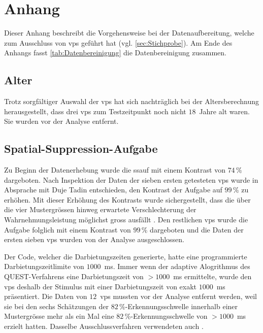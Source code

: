 \documentclass[11pt, twoside, a4paper]{book}		%
\begin{document}
\appendix
\setcounter{figure}{0}
\renewcommand\thefigure{\Alph{appndx}\@arabic\c@figure}
\setcounter{table}{0}
\renewcommand{\thetable}{A\arabic{table}}


\chapter[Anhang - Datenaufbereitung]{Anhang \label{cha:Anhang_A}}
Dieser Anhang beschreibt die Vorgehensweise bei der Datenaufbereitung, welche zum Ausschluss von \glspl{vp} geführt hat (vgl. \autoref{sec:Stichprobe}). Am Ende des Anhangs fasst \autoref{tab:Datenbereinigung} die Datenbereinigung zusammen.

\section{Alter}
Trotz sorgfältiger Auswahl der \glspl{vp} hat sich nachträglich bei der Altersberechnung herausgestellt, dass drei \glspl{vp} zum Testzeitpunkt noch nicht $18$~Jahre alt waren. Sie wurden vor der Analyse entfernt.

\section{Spatial-Suppression-Aufgabe}
Zu Beginn der Datenerhebung wurde die \gls{ssauf} mit einem Kontrast von $74\,\%$ dargeboten. Nach Inspektion der Daten der sieben ersten getesteten \glspl{vp} wurde in Absprache mit Duje Tadin entschieden, den Kontrast der Aufgabe auf $99\,\%$ zu erhöhen. Mit dieser Erhöhung des Kontrasts wurde sichergestellt, dass die über die vier Mustergrössen hinweg erwartete Verschlechterung der Wahrnehmungsleistung möglichst gross ausfällt \citep[für den Zusammenhang zwischen Kontrast und Wahrnehmungsleistung siehe][]{Tadin2003}. Den restlichen \glspl{vp} wurde die Aufgabe folglich mit einem Kontrast von $99\,\%$ dargeboten und die Daten der ersten sieben \glspl{vp} wurden von der Analyse ausgeschlossen.

Der Code, welcher die Darbietungszeiten generierte, hatte eine programmierte Darbietungszeitlimite von $1000$~ms. Immer wenn der adaptive Alogrithmus des QUEST-Verfahrens \citep{Watson1983} eine Darbietungszeit von $> 1000$~ms ermittelte, wurde den \glspl{vp} deshalb der Stimulus mit einer Darbietungszeit von exakt $1000$~ms präsentiert. 
Die Daten von $12$~\glspl{vp} mussten vor der Analyse entfernt werden, weil sie bei den sechs Schätzungen der $82\,\%$-Er\-ken\-nungs\-schwel\-le innerhalb einer Mustergrösse mehr als ein Mal eine $82\,\%$-Er\-ken\-nungs\-schwel\-le von $> 1000$~ms erzielt hatten. Dasselbe Ausschlussverfahren verwendeten auch \citet{Melnick2013}.
\end{document}
